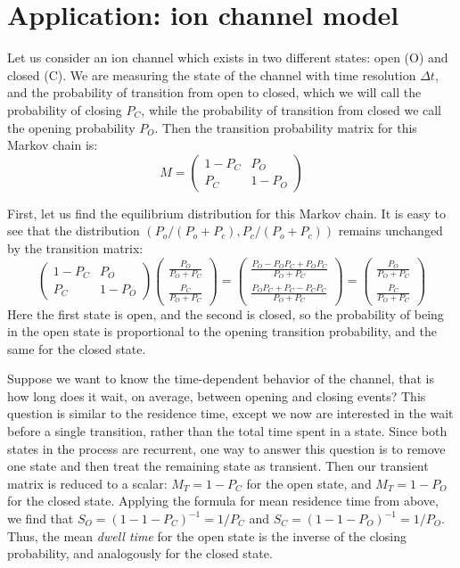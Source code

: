 \documentclass[11pt]{book}
\begin{document}
\section{Application: ion channel model}
Let us consider an ion channel which exists in two different states: open (O) and closed (C). We are measuring the state of the channel with time resolution $\Delta t$, and the probability of transition from open to closed, which we will call the probability of closing $P_C$, while the probability of transition from closed we call the opening probability $P_{O}$. Then the transition probability matrix for this Markov chain is:
$$ M =  \left(\begin{array}{cc} 1-P_C & P_O \\ P_C & 1-P_O  \end{array}\right) $$


First, let us find the equilibrium distribution for this Markov chain. It is easy to see that the distribution $(P_o/(P_o + P_c), P_c/(P_o + P_c))$ remains unchanged by the transition matrix:
$$  \left(\begin{array}{cc} 1-P_C & P_O \\ P_C & 1-P_O  \end{array}\right)  \left(\begin{array}{c} \frac{P_O}{P_O+P_C} \\  \frac{P_C}{P_O+P_C} \end{array}\right)  =  \left(\begin{array}{c} \frac{P_O - P_OP_C + P_OP_C}{P_O+P_C} \\  \frac{P_OP_C + P_C -P_CP_C}{P_O+P_C} \end{array}\right) =   \left(\begin{array}{c} \frac{P_O}{P_O+P_C} \\  \frac{P_C}{P_O+P_C} \end{array}\right) $$
Here the first state is open, and the second is closed, so the probability of being in the open state is proportional to the opening transition probability, and the same for the closed state.

Suppose we want to know the time-dependent behavior of the channel, that is how long does it wait, on average, between opening and closing events? This question is similar to the residence time, except we now are interested in the wait before a single transition, rather than the total time spent in a state. Since both states in the process are recurrent, one way to answer this question is to remove one state and then treat the remaining state as transient. Then our transient matrix is reduced to a scalar: $M_T = 1-P_C$ for the open state, and $M_T = 1 - P_O$ for the closed state. Applying the formula for mean residence time from above, we find that $S_O = (1 - 1 - P_C)^{-1} = 1/P_C$ and $S_C = (1 - 1 - P_O)^{-1} = 1/P_O$. Thus, the mean \emph{dwell time} for the open state is the inverse of the closing probability, and analogously for the closed state.
\end{document}
